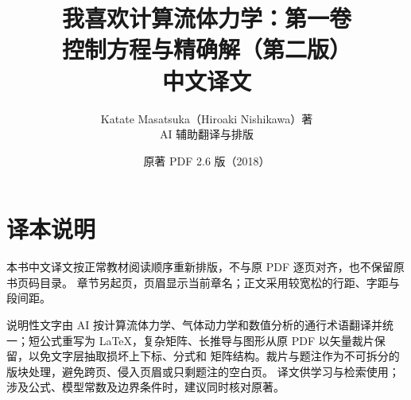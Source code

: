 \documentclass[11pt,a4paper,openany,fontset=none]{ctexbook}
\title{我喜欢计算流体力学：第一卷\\[0.45em]
\Large 控制方程与精确解（第二版）\\[0.7em]\large 中文译文}
\author{Katate Masatsuka（Hiroaki Nishikawa）著\\\small AI 辅助翻译与排版}
\date{原著 PDF 2.6 版（2018）}
\begin{document}
\frontmatter
\maketitle
\chapter*{译本说明}
本书中文译文按正常教材阅读顺序重新排版，不与原 PDF 逐页对齐，也不保留原书页码目录。
章节另起页，页眉显示当前章名；正文采用较宽松的行距、字距与段间距。

说明性文字由 AI 按计算流体力学、气体动力学和数值分析的通行术语翻译并统一；短公式重写为
LaTeX，复杂矩阵、长推导与图形从原 PDF 以矢量裁片保留，以免文字层抽取损坏上下标、分式和
矩阵结构。裁片与题注作为不可拆分的版块处理，避免跨页、侵入页眉或只剩题注的空白页。
译文供学习与检索使用；涉及公式、模型常数及边界条件时，建议同时核对原著。

\begingroup\small\tableofcontents\endgroup
\end{document}

